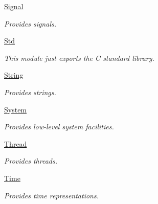 \begin{DoxyCompactItemize}
\hyperlink{group___fa_signal}{Signal}
\begin{DoxyCompactList}\small\item\em Provides signals. \end{DoxyCompactList}\item 
\hyperlink{group___fa_std}{Std}
\begin{DoxyCompactList}\small\item\em This module just exports the C standard library. \end{DoxyCompactList}\item 
\hyperlink{group___fa_string}{String}
\begin{DoxyCompactList}\small\item\em Provides strings. \end{DoxyCompactList}\item 
\hyperlink{group___fa_system}{System}
\begin{DoxyCompactList}\small\item\em Provides low-\/level system facilities. \end{DoxyCompactList}\item 
\hyperlink{group___fa_thread}{Thread}
\begin{DoxyCompactList}\small\item\em Provides threads. \end{DoxyCompactList}\item 
\hyperlink{group___fa_time}{Time}
\begin{DoxyCompactList}\small\item\em Provides time representations. \end{DoxyCompactList}\end{DoxyCompactItemize}
